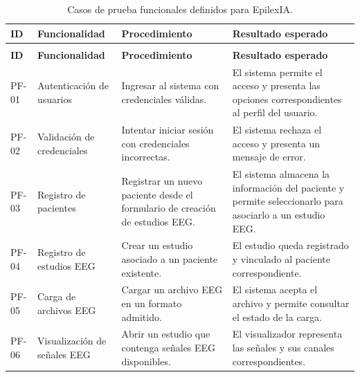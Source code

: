 \begin{longtable}{|
>{\raggedright\arraybackslash}p{}|
>{\raggedright\arraybackslash}p{}|
>{\raggedright\arraybackslash}p{}|
>{\raggedright\arraybackslash}p{}|}


\caption{Casos de prueba funcionales definidos para EpilexIA.}
\label{tab:casos_pruebas_funcionales}\\
\hline

\textbf{ID} &
\textbf{Funcionalidad} &
\textbf{Procedimiento} &
\textbf{Resultado esperado} \\
\hline
\endfirsthead

\multicolumn{4}{c}{\textit{Continuación del Cuadro \thetable}}\\
\hline
\textbf{ID} &
\textbf{Funcionalidad} &
\textbf{Procedimiento} &
\textbf{Resultado esperado} \\
\hline
\endhead

\hline
\endfoot


PF-01 &
Autenticación de usuarios &
Ingresar al sistema con credenciales válidas. &
El sistema permite el acceso y presenta las opciones correspondientes al perfil del usuario. \\
\hline

PF-02 &
Validación de credenciales &
Intentar iniciar sesión con credenciales incorrectas. &
El sistema rechaza el acceso y presenta un mensaje de error. \\
\hline

PF-03 &
Registro de pacientes &
Registrar un nuevo paciente desde el formulario de creación de estudios EEG. &
El sistema almacena la información del paciente y permite seleccionarlo para asociarlo a un estudio EEG. \\
\hline

PF-04 &
Registro de estudios EEG &
Crear un estudio asociado a un paciente existente. &
El estudio queda registrado y vinculado al paciente correspondiente. \\
\hline

PF-05 &
Carga de archivos EEG &
Cargar un archivo EEG en un formato admitido. &
El sistema acepta el archivo y permite consultar el estado de la carga. \\
\hline

PF-06 &
Visualización de señales EEG &
Abrir un estudio que contenga señales EEG disponibles. &
El visualizador representa las señales y sus canales correspondientes. \\
\hline


\end{longtable}
